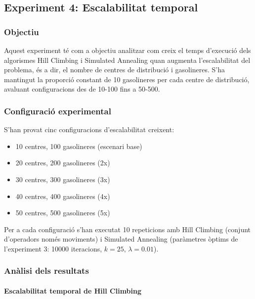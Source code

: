 \subsection{Experiment 4: Escalabilitat temporal}

\vspace{0.5cm}

\subsubsection{Objectiu}

Aquest experiment té com a objectiu analitzar com creix el temps d'execució dels algorismes Hill Climbing i Simulated Annealing quan augmenta l'escalabilitat del problema, és a dir, el nombre de centres de distribució i gasolineres. S'ha mantingut la proporció constant de 10 gasolineres per cada centre de distribució, avaluant configuracions des de 10-100 fins a 50-500.

\vspace{0.5cm}


\subsubsection{Configuració experimental}

S'han provat cinc configuracions d'escalabilitat creixent:
\begin{itemize}
    \item 10 centres, 100 gasolineres (escenari base)
    \item 20 centres, 200 gasolineres (2x)
    \item 30 centres, 300 gasolineres (3x)
    \item 40 centres, 400 gasolineres (4x)
    \item 50 centres, 500 gasolineres (5x)
\end{itemize}

Per a cada configuració s'han executat 10 repeticions amb Hill Climbing (conjunt d'operadors només moviments) i Simulated Annealing (paràmetres òptims de l'experiment 3: 10000 iteracions, $k=25$, $\lambda=0.01$).

\vspace{0.5cm}


\subsubsection{Anàlisi dels resultats}

\paragraph{Escalabilitat temporal de Hill Climbing}

